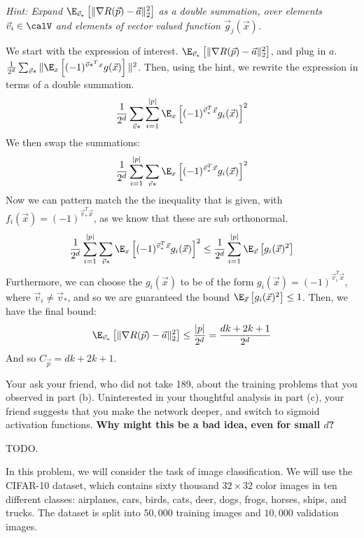 \documentclass[11pt]{article}
\begin{document}
\begin{Parts}
\begin{enumerate}[(i)]
\emph{Hint: Expand $\E_{\vec v_*}\left[\|\nabla R(\vec p) - \vec a\|_2^2\right]$ as a double summation, over elements $\vec v_i\in\calV$ and elements of vector valued function $\vec g_j(\vec x)$.}

\begin{tcolorbox}[breakable]
	We start with the expression of interest. $\E_{\vec v_*}\left[\|\nabla R(\vec p) - \vec a\|_2^2\right]$, and plug in $a$. $\frac{1}{2^d}\sum_{\vec v*}\|\E_{x}\left[ (-1)^{\vec v*^Tx}g(\vec x) \right]\|^2$. Then, using the hint, we rewrite the expression in terms of a double summation.
	$$\frac{1}{2^d}\sum_{\vec v*}\sum_{i=1}^{|p|}\E_x\left[ (-1)^{\vec v_*^T\vec x}g_i(\vec x) \right]^2$$
	We then swap the summations: 
	$$\frac{1}{2^d}\sum_{i=1}^{|p|}\sum_{\vec v*}\E_x\left[ (-1)^{\vec v_*^T\vec x}g_i(\vec x) \right]^2$$
	Now we can pattern match the the inequality that is given, with $f_i(\vec x)=(-1)^{\vec v_*^T\vec x}$, as we know that these are sub orthonormal. 
	$$\frac{1}{2^d}\sum_{i=1}^{|p|}\sum_{\vec v*}\E_x\left[ (-1)^{\vec v_*^T\vec x}g_i(\vec x) \right]^2 \leq \frac{1}{2^d}\sum_{i=1}^{|p|}\E_{\vec x}\left[ g_i(\vec x)^2 \right]$$
	Furthermore, we can choose the $g_i(\vec x)$ to be of the form $g_i(\vec x)=(-1)^{\vec v_i^T\vec x}$, where $\vec v_i \neq \vec v_*$, and so we are guaranteed the bound $\E_{\vec x}\left[ g_i(\vec x)^2 \right] \leq 1$. Then, we have the final bound:
	$$\E_{\vec v_*}\left[\|\nabla R(\vec p) - \vec a\|_2^2\right] \leq \frac{|p|}{2^d}=\frac{dk+2k+1}{2^d}$$
	And so $C_{\vec p}=dk+2k+1$. 
\end{tcolorbox}

\end{enumerate}

\Part Your ask your friend, who did not take 189, about the training problems that you observed in part (b). Uninterested in your thoughtful analysis in part (c), your friend suggests that you make the network deeper, and switch to sigmoid activation functions. {\bf Why might this be a bad idea, even for small $d$?} 

\begin{tcolorbox}[breakable]
	TODO.
\end{tcolorbox}

\end{Parts}


In this problem, we will consider the task of image classification. 
We will use the CIFAR-10 dataset, which contains sixty thousand $32\times32$ color images in ten different classes: airplanes, cars, birds, cats, deer, dogs, frogs, horses, ships, and trucks. The dataset is split into $50,000$ training images and $10,000$ validation images.
\end{document}
